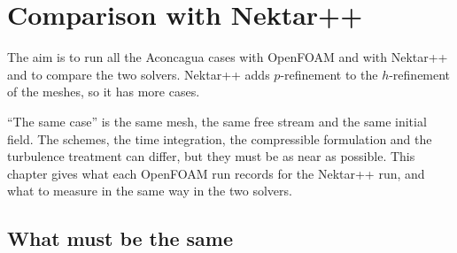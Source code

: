 \chapter{Comparison with Nektar++}\label{ch:nektar}

The aim is to run all the Aconcagua cases with OpenFOAM and with Nektar++ and to
compare the two solvers. Nektar++ adds $p$-refinement to the $h$-refinement of the
meshes, so it has more cases.

``The same case'' is the same mesh, the same free stream and the same initial field.
The schemes, the time integration, the compressible formulation and the turbulence
treatment can differ, but they must be as near as possible. This chapter gives what
each OpenFOAM run records for the Nektar++ run, and what to measure in the same way in
the two solvers.

\section{What must be the same}\label{sec:nektar-same}


